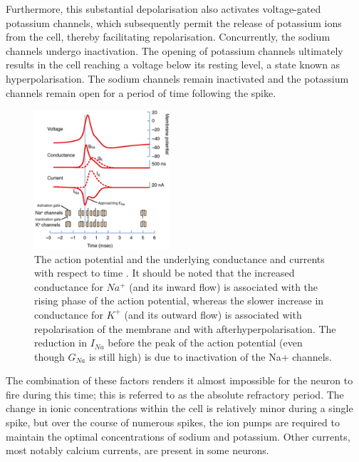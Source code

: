 \noindent Furthermore, this substantial depolarisation also activates voltage-gated potassium channels, which subsequently permit the release of potassium ions from the cell, thereby facilitating repolarisation. Concurrently, the sodium channels undergo inactivation. The opening of potassium channels ultimately results in the cell reaching a voltage below its resting level, a state known as hyperpolarisation. The sodium channels remain inactivated and the potassium channels remain open for a period of time following the spike. \\

\begin{figure}[htbp!] 
    \centering    
    \includegraphics[width=0.45\textwidth]{Chapter1/Figs/1b.png}
    \caption[Spiking dynamics of a neuron.]{The action potential and the underlying conductance and currents with respect to time \cite{squire2012fundamental}. It should be noted that the increased conductance for $Na^+$ (and its inward flow) is associated with the rising phase of the action potential, whereas the slower increase in conductance for $K^+$ (and its outward flow) is associated with repolarisation of the membrane and with afterhyperpolarisation. The reduction in $I_{Na}$ before the peak of the action potential (even though $G_{Na}$ is still high) is due to inactivation of the Na+ channels.}
    \label{fig:1b}
\end{figure}

\noindent The combination of these factors renders it almost impossible for the neuron to fire during this time; this is referred to as the absolute refractory period. The change in ionic concentrations within the cell is relatively minor during a single spike, but over the course of numerous spikes, the ion pumps are required to maintain the optimal concentrations of sodium and potassium. Other currents, most notably calcium currents, are present in some neurons. \\

